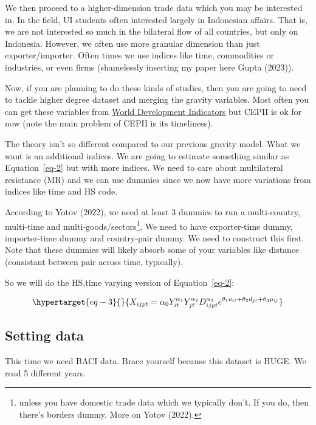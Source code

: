 \documentclass[
  a4paper,
  DIV=11,
  numbers=noendperiod]{scrreprt}
\begin{document}
We then proceed to a higher-dimension trade data which you may be
interested in. In the field, UI students often interested largely in
Indonesian affairs. That is, we are not interested so much in the
bilateral flow of all countries, but only on Indonesia. However, we
often use more granular dimension than just exporter/importer. Often
times we use indices like time, commodities or industries, or even firms
(shamelessly inserting my paper here Gupta (2023)).

Now, if you are planning to do these kinds of studies, then you are
going to need to tackle higher degree dataset and merging the gravity
variables. Most often you can get these variables from
\href{https://databank.worldbank.org/source/world-development-indicators}{World
Development Indicators} but CEPII is ok for now (note the main problem
of CEPII is its timeliness).

The theory isn't so different compared to our previous gravity model.
What we want is an additional indices. We are going to estimate
something similar as Equation~\ref{eq-2} but with more indices. We need
to care about multilateral resistance (MR) and we can use dummies since
we now have more variations from indices like time and HS code.

According to Yotov (2022), we need at least 3 dummies to run a
multi-country, multi-time and multi-goods/sectors\footnote{unless you
  have domestic trade data which we typically don't. If you do, then
  there's borders dummy. More on Yotov (2022).}. We need to have
exporter-time dummy, importer-time dummy and country-pair dummy. We need
to construct this first. Note that these dummies will likely absorb some
of your variables like distance (consistant between pair across time,
typically).

So we will do the HS,time varying version of Equation~\ref{eq-2}:

\begin{equation}\protect\hypertarget{eq-3}{}{
X_{ijpt}=\alpha_0 Y_{it}^{\alpha_1}Y_{jt}^{\alpha_2}D_{ijpt}^{\alpha_3}e^{\theta_1o_{it}+\theta_2d_{jt}+\theta_3p_{ij}}
}\label{eq-3}\end{equation}

\hypertarget{setting-data-1}{%
\subsection{Setting data}\label{setting-data-1}}

This time we need BACI data. Brace yourself because this dataset is
HUGE. We read 5 different years.
\end{document}
